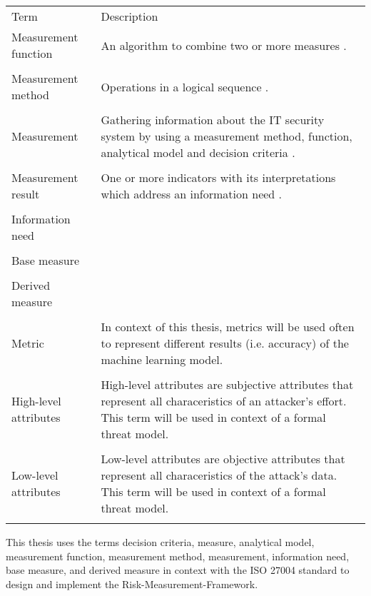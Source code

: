 \begin{center}
  \begin{tabular}{ |L{4cm}|L{10cm}|  }
    \hline
     Term & Description \\ [0.5ex]
    Measurement function & An algorithm to combine two or more measures \cite{ISO_27004_2009}. \\
    & \\
    \hline
    Measurement method & Operations in a logical sequence \cite{ISO_27004_2009}. \\
    & \\
    \hline
    Measurement & Gathering information about the IT security system by using a measurement method, function, analytical model and decision criteria \cite{ISO_27004_2009}. \\
    & \\
    \hline
    Measurement result & One or more indicators with its interpretations which address an information need \cite{ISO_27004_2009}. \\
    & \\
    \hline
    Information need & \\
    & \\
    \hline
    Base measure & \\
    & \\
    \hline
    Derived measure & \\
    & \\
    \hline
    Metric & In context of this thesis, metrics will be used often to represent different results (i.e. accuracy) of the machine learning model. \\
    & \\
    \hline
    High-level attributes & High-level attributes are subjective attributes that represent all characeristics of an attacker's effort. This term will be used in context of a formal threat model. \\
    & \\
    \hline
    Low-level attributes & Low-level attributes are objective attributes that represent all characeristics of the attack's data. This term will be used in context of a formal threat model. \\
    & \\
    \hline
  \end{tabular}
\end{center}

This thesis uses the terms decision criteria, measure, analytical model, measurement function, measurement method, measurement, information need, base measure, and derived measure in context with the ISO 27004 standard to design and implement the Risk-Measurement-Framework.
